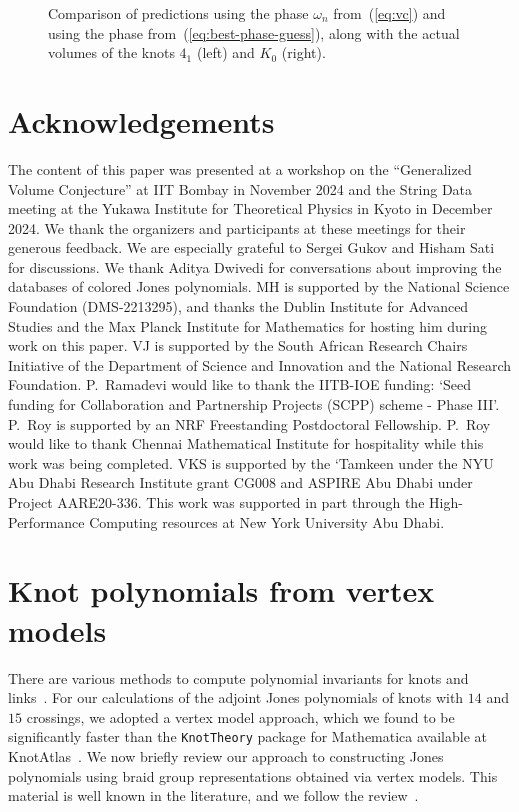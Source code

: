\documentclass[11pt]{article}
\begin{document}
\begin{figure}
	\centering
    \caption{\textsf{Comparison of predictions using the phase $\omega_n$ from~(\ref{eq:vc}) and using the phase from~(\ref{eq:best-phase-guess}), along with the actual volumes of the knots $4_1$ (left) and $K_0$ (right).}}
    \label{fig:K0-41}
\end{figure} 


\section*{Acknowledgements}
The content of this paper was presented at a workshop on the ``Generalized Volume Conjecture'' at IIT Bombay in November 2024 and the String Data meeting at the Yukawa Institute for Theoretical Physics in Kyoto in December 2024.
We thank the organizers and participants at these meetings for their generous feedback.
We are especially grateful to Sergei Gukov and Hisham Sati for discussions.
We thank Aditya Dwivedi for conversations about improving the databases of colored Jones polynomials.
MH is supported by the National Science Foundation (DMS-2213295), and thanks the Dublin Institute for Advanced Studies and the Max Planck Institute for Mathematics for hosting him during work on this paper.
VJ is supported by the South African Research Chairs Initiative
of the Department of Science and Innovation and the National Research Foundation.
P.~Ramadevi would like to thank the IITB-IOE funding:  `Seed funding for Collaboration and Partnership Projects (SCPP) scheme - Phase III'.
P.~Roy is supported by an NRF Freestanding Postdoctoral Fellowship. P.~Roy would like to thank Chennai Mathematical Institute for hospitality while this work was being completed.
VKS is supported by the ‘Tamkeen under the NYU Abu Dhabi Research Institute grant CG008 and ASPIRE Abu Dhabi under Project AARE20-336. This work was supported in part through the High-Performance Computing resources at New York University Abu Dhabi.

\appendix
\section{Knot polynomials from vertex models}\label{sec:app}

There are various methods to compute polynomial invariants for knots and links~\cite{Witten:1988hf,KirResh,RT1,RT2,Itoyama:2012qt,Kaul:1992rs,Devi:1993ue,RGK,DMMMRSS:2017,DMMMRSS:2018}. For our calculations of the adjoint Jones polynomials of knots with $14$ and $15$ crossings, we adopted a vertex model approach, which we found to be significantly faster than the \texttt{KnotTheory} package for Mathematica available at KnotAtlas~\cite{KnotAtlas}. We now briefly review our approach to constructing Jones polynomials using braid group representations obtained via vertex models. This material is well known in the literature, and we follow the review~\cite{Wadati:1989ud}. 
\end{document}
